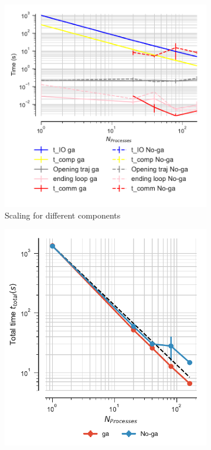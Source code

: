  \begin{figure}[ht!]
\centering
\begin{subfigure}{.3\textwidth}
  \includegraphics[width=\linewidth]{figures/Comparison_IO_compute_scaling_traj_splitting-SuperMIC.pdf}
  \captionsetup{format=hang}
  \caption{Scaling for different components}
  \label{fig:MPIscaling-SuperMIC}
\end{subfigure}
\hfill
\begin{subfigure}{.3\textwidth}
  \includegraphics[width=\linewidth]{figures/Comparison_tot_time_traj_splitting-SuperMIC.pdf}

\end{subfigure}
\end{figure}
